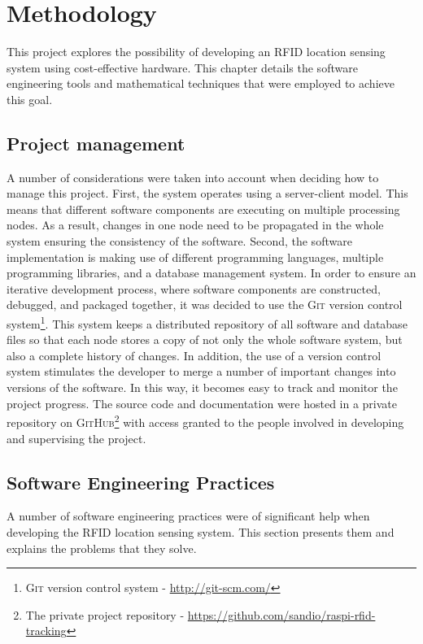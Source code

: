 \chapter{Methodology}
\label{ch:methodology}

This project explores the possibility of developing an RFID location sensing system using cost-effective hardware. This chapter details the software engineering tools and mathematical techniques that were employed to achieve this goal.

\section{Project management}

A number of considerations were taken into account when deciding how to manage this project. First, the system operates using a server-client model. This means that different software components are executing on multiple processing nodes. As a result, changes in one node need to be propagated in the whole system ensuring the consistency of the software.  Second, the software implementation is making use of different programming languages, multiple programming libraries, and a database management system. In order to ensure an iterative development process, where software components are constructed, debugged, and packaged together, it was decided to use the \textsc{Git} version control system\footnote{\textsc{Git} version control system - \url{http://git-scm.com/}}. This system keeps a distributed repository of all software and database files so that each node stores a copy of not only the whole software system, but also a complete history of changes. In addition, the use of a version control system stimulates the developer to merge a number of important changes into versions of the software. In this way, it becomes easy to track and monitor the project progress. The source code and documentation were hosted in a private repository on \textsc{GitHub}\footnote{The private project repository - \url{https://github.com/sandio/raspi-rfid-tracking}} with access granted to the people involved in developing and supervising the project.


\section{Software Engineering Practices}

A number of software engineering practices were of significant help when developing the RFID location sensing system. This section presents them and explains the problems that they solve.  

